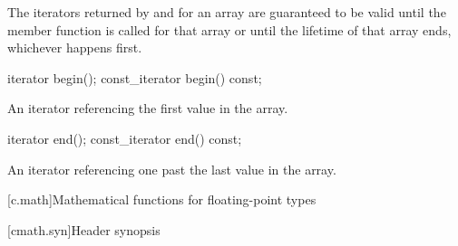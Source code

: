 \pnum
The iterators returned by  and  for an array
are guaranteed to be valid until the member function
 is called for that
array or until the lifetime of that array ends, whichever happens
first.

%
\begin{itemdecl}
iterator begin();
const_iterator begin() const;
\end{itemdecl}

\begin{itemdescr}
\pnum
\returns
An iterator referencing the first value in the array.
\end{itemdescr}

%
\begin{itemdecl}
iterator end();
const_iterator end() const;
\end{itemdecl}

\begin{itemdescr}
\pnum
\returns
An iterator referencing one past the last value in the array.
\end{itemdescr}

[c.math]{Mathematical functions for floating-point types}

[cmath.syn]{Header  synopsis}

